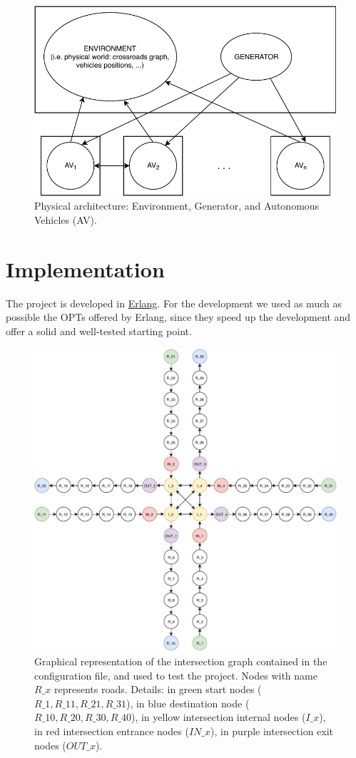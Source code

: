 \documentclass{memoir}
\begin{document}
\begin{figure}
	\centering
	\includegraphics[width=0.8\linewidth]{physical_architecture.pdf}
	\caption{Physical architecture: Environment, Generator, and Autonomous Vehicles (AV).}
	\label{fig:physical-architecture}
\end{figure}


\chapter{Implementation}
The project is developed in \href{https://www.erlang.org/}{Erlang}. For the development we used as much as possible the OPTs offered by Erlang, since they speed up the development and offer a solid and well-tested starting point.

\begin{figure}
	\centering
	\includegraphics[width=\linewidth]{config_graph.pdf}
	\caption{Graphical representation of the intersection graph contained in the configuration file, and used to test the project. Nodes with name $R\_x$ represents roads. Details: in green start nodes ($R\_1, R\_11, R\_21, R\_31$), in blue destination node ($R\_10, R\_20, R\_30, R\_40$), in yellow intersection internal nodes ($I\_x$), in red intersection entrance nodes ($IN\_x$), in purple intersection exit nodes ($OUT\_x$). }
	\label{fig:config-graph}
\end{figure}
\end{document}

